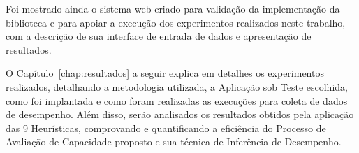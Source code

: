 Foi mostrado ainda o sistema web criado para validação da implementação da biblioteca e para 
apoiar a execução dos experimentos realizados neste trabalho, com a descrição de sua interface de
entrada de dados e apresentação de resultados.

O Capítulo~\ref{chap:resultados} a seguir explica em detalhes os experimentos 
realizados, detalhando a metodologia utilizada, a Aplicação sob Teste escolhida, como
foi implantada e como foram realizadas as execuções para coleta de dados de desempenho. 
Além disso, serão analisados os resultados obtidos pela aplicação das 9 Heurísticas, 
comprovando e quantificando a eficiência do Processo de Avaliação de Capacidade proposto
e sua técnica de Inferência de Desempenho.
 
